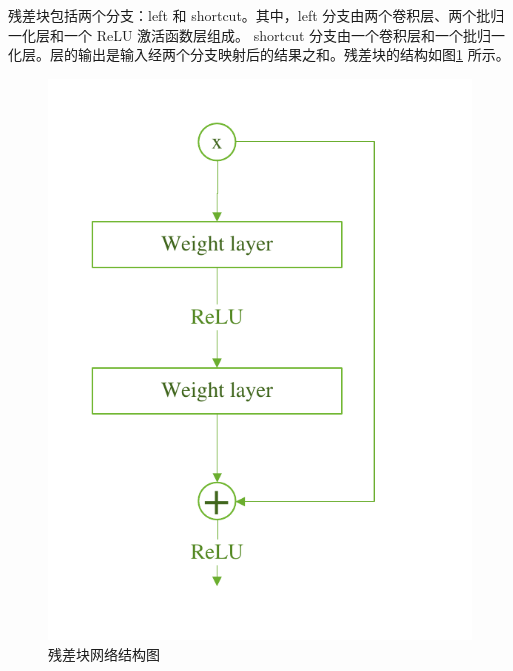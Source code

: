 \documentclass[supercite]{Experimental_Report}
\theoremstyle{definition}
\begin{document}
残差块包括两个分支：left 和 shortcut。其中，left 分支由两个卷积层、两个批归一化层和一个 ReLU 激活函数层组成。
shortcut 分支由一个卷积层和一个批归一化层。层的输出是输入经两个分支映射后的结果之和。残差块的结构如图\ref{残差块网络结构图}
所示。
\begin{figure}[H]
	\begin{center}
		\includegraphics[scale=0.7]{../images/残差块网络结构图.pdf}
		\caption{残差块网络结构图}
		\label{残差块网络结构图}
	\end{center}
\end{figure}
\end{document}

